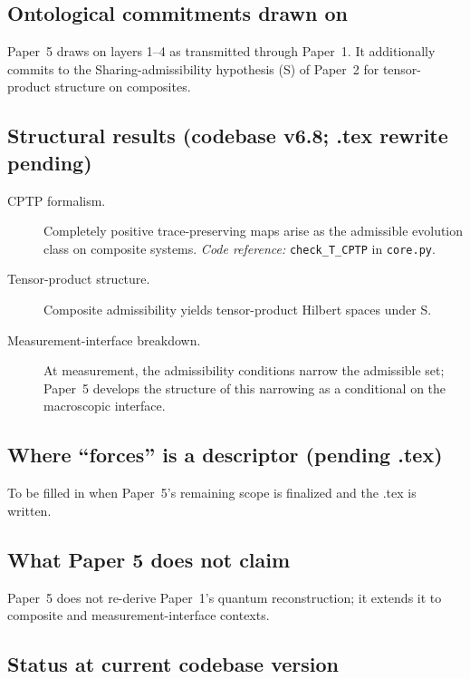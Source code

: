 \documentclass[11pt]{article}
\newcommand{\coderef}[2]{\smallskip\noindent\textit{Code reference:} \texttt{#1} in \texttt{#2}.}
\begin{document}
\subsection{Ontological commitments drawn on}\label{sec:P5_commitments}

Paper~5 draws on layers 1--4 as transmitted through Paper~1. It additionally commits to the Sharing-admissibility hypothesis (S) of Paper~2 for tensor-product structure on composites.

\subsection{Structural results (codebase v6.8; .tex rewrite pending)}\label{sec:P5_results}

\begin{description}
    \item[CPTP formalism.] Completely positive trace-preserving maps arise as the admissible evolution class on composite systems. \coderef{check\_T\_CPTP}{core.py}
    \item[Tensor-product structure.] Composite admissibility yields tensor-product Hilbert spaces under S.
    \item[Measurement-interface breakdown.] At measurement, the admissibility conditions narrow the admissible set; Paper~5 develops the structure of this narrowing as a conditional on the macroscopic interface.
\end{description}

\subsection{Where ``forces'' is a descriptor (pending .tex)}\label{sec:P5_forces}

To be filled in when Paper~5's remaining scope is finalized and the .tex is written.

\subsection{What Paper 5 does not claim}\label{sec:P5_does_not_claim}

Paper~5 does not re-derive Paper~1's quantum reconstruction; it extends it to composite and measurement-interface contexts.

\subsection{Status at current codebase version}\label{sec:P5_status}
\end{document}
